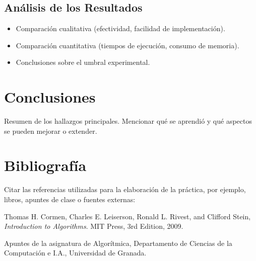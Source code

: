 \documentclass[a4paper,12pt]{article}
\begin{document}
\subsection{Análisis de los Resultados}
\begin{itemize}
    \item Comparación cualitativa (efectividad, facilidad de implementación).
    \item Comparación cuantitativa (tiempos de ejecución, consumo de memoria).
    \item Conclusiones sobre el umbral experimental.
\end{itemize}

\section{Conclusiones}
Resumen de los hallazgos principales. Mencionar qué se aprendió 
y qué aspectos se pueden mejorar o extender.

\section{Bibliografía}
Citar las referencias utilizadas para la elaboración de la práctica, 
por ejemplo, libros, apuntes de clase o fuentes externas:

\begin{thebibliography}{9}
    Thomas H. Cormen, Charles E. Leiserson, Ronald L. Rivest, and Clifford Stein, 
    \textit{Introduction to Algorithms}. MIT Press, 3rd Edition, 2009.
    
    Apuntes de la asignatura de Algorítmica, Departamento de Ciencias de la Computación e I.A., 
    Universidad de Granada.
\end{thebibliography}
\end{document}
